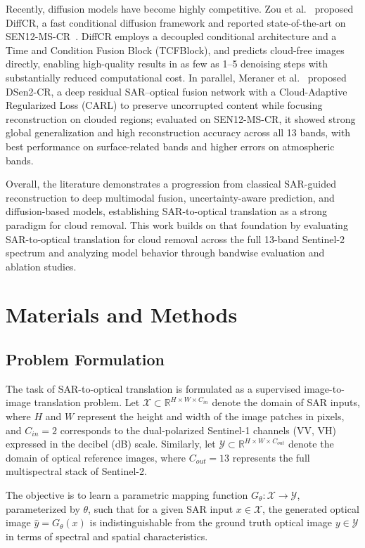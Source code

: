\documentclass[remotesensing,article,submit,pdftex,moreauthors]{Definitions/mdpi}
\begin{document}
Recently, diffusion models have become highly competitive. Zou et al.~\cite{DiffCR} proposed DiffCR, a fast conditional diffusion framework and reported state-of-the-art on SEN12-MS-CR~\cite{sen12ms-cr_2021}. DiffCR employs a decoupled conditional architecture and a Time and Condition Fusion Block (TCFBlock), and predicts cloud-free images directly, enabling high-quality results in as few as 1–5 denoising steps with substantially reduced computational cost. In parallel, Meraner et al.~\cite{CR_SEN2_dRNN} proposed DSen2-CR, a deep residual SAR–optical fusion network with a Cloud-Adaptive Regularized Loss (CARL) to preserve uncorrupted content while focusing reconstruction on clouded regions; evaluated on SEN12-MS-CR, it showed strong global generalization and high reconstruction accuracy across all 13 bands, with best performance on surface-related bands and higher errors on atmospheric bands.

Overall, the literature demonstrates a progression from classical SAR-guided reconstruction to deep multimodal fusion, uncertainty-aware prediction, and diffusion-based models, establishing SAR-to-optical translation as a strong paradigm for cloud removal. This work builds on that foundation by evaluating SAR-to-optical translation for cloud removal across the full 13-band Sentinel-2 spectrum and analyzing model behavior through bandwise evaluation and ablation studies.

% 
\section{Materials and Methods}
\subsection{Problem Formulation}
The task of SAR-to-optical translation is formulated as a supervised image-to-image translation problem. Let $\mathcal{X} \subset \mathbb{R}^{H \times W \times C_{in}}$ denote the domain of SAR inputs, where $H$ and $W$ represent the height and width of the image patches in pixels, and $C_{in}=2$ corresponds to the dual-polarized Sentinel-1 channels (VV, VH) expressed in the decibel (dB) scale. Similarly, let $\mathcal{Y} \subset \mathbb{R}^{H \times W \times C_{out}}$ denote the domain of optical reference images, where $C_{out}=13$ represents the full multispectral stack of Sentinel-2. 

The objective is to learn a parametric mapping function $G_{\theta}: \mathcal{X} \rightarrow \mathcal{Y}$, parameterized by $\theta$, such that for a given SAR input $x \in \mathcal{X}$, the generated optical image $\hat{y} = G_{\theta}(x)$ is indistinguishable from the ground truth optical image $y \in \mathcal{Y}$ in terms of spectral and spatial characteristics.
\end{document}

